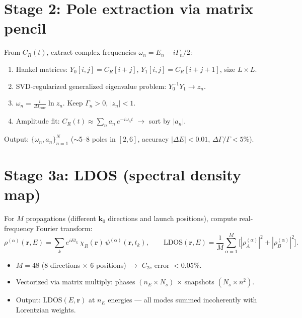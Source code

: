 \documentclass[11pt,a4paper]{article}
\newcommand{\vb}[1]{\mathbf{#1}}
\begin{document}
\section*{Stage 2: Pole extraction via matrix pencil}

From $C_R(t)$, extract complex frequencies
$\omega_n = E_n - i\Gamma_n/2$:

\begin{enumerate}[nosep,leftmargin=1.5em]
  \item Hankel matrices:
        $Y_0[i,j] = C_R[i+j]$, \;
        $Y_1[i,j] = C_R[i+j+1]$, \; size $L \times L$.
  \item SVD-regularized generalized eigenvalue problem:
        $Y_0^{-1} Y_1 \to z_n$.
  \item $\omega_n = \frac{i}{\Delta t_\text{corr}} \ln z_n$.
        Keep $\Gamma_n > 0$, $|z_n| < 1$.
  \item Amplitude fit: $C_R(t) \approx \sum_n a_n\, e^{-i\omega_n t}$
        $\to$ sort by $|a_n|$.
\end{enumerate}

Output: $\{\omega_n, a_n\}_{n=1}^N$
($\sim$5--8 poles in $[2, 6]$, accuracy $|\Delta E| < 0.01$,
$\Delta\Gamma/\Gamma < 5\%$).

\section*{Stage 3a: LDOS (spectral density map)}

For $M$ propagations (different $\vb{k}_0$ directions and
launch positions), compute real-frequency Fourier transform:
\begin{equation*}
  \rho^{(\alpha)}(\vb{r}, E)
  = \sum_k e^{iE t_k}\, \chi_R(\vb{r})\, \psi^{(\alpha)}(\vb{r}, t_k),
  \qquad
  \text{LDOS}(\vb{r}, E)
  = \frac{1}{M} \sum_{\alpha=1}^{M}
    \big[|\rho_A^{(\alpha)}|^2 + |\rho_B^{(\alpha)}|^2\big].
\end{equation*}

\begin{itemize}[nosep,leftmargin=1.5em]
  \item $M = 48$ (8 directions $\times$ 6 positions)
        $\to$ $C_{2v}$ error $< 0.05\%$.
  \item Vectorized via matrix multiply:
        phases $(n_E \times N_s)$ $\times$ snapshots
        $(N_s \times n^2)$.
  \item Output: $\text{LDOS}(E, \vb{r})$ at $n_E$ energies ---
        all modes summed incoherently with Lorentzian weights.
\end{itemize}
\end{document}
